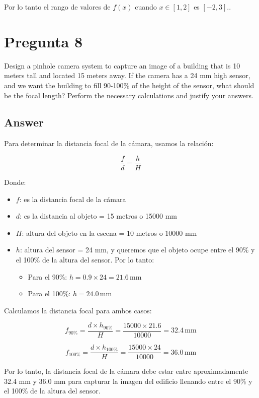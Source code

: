 \documentclass{article}
\begin{document}
Por lo tanto el rango de valores de $f(x)$ cuando $x \in [1, 2]$ es $[-2, 3]$..

\section{Pregunta 8}

Design a pinhole camera system to capture an image of a building that is 10 meters tall and located 15 meters away. If the camera has a 24 mm high sensor, and we want the building to fill 90-100\% of the height of the sensor, what should be the focal length? Perform the necessary calculations and justify your answers.

\subsection{Answer}

Para determinar la distancia focal de la cámara, usamos la relación:

\[
\frac{f}{d} = \frac{h}{H}
\]

Donde:

\begin{itemize}
    \item $f$: es la distancia focal de la cámara
    \item $d$: es la distancia al objeto = 15 metros o 15000 mm
    \item $H$: altura del objeto en la escena = 10 metros o 10000 mm
    \item $h$: altura del sensor = 24 mm, y queremos que el objeto ocupe entre el 90\% y el 100\% de la altura del sensor. Por lo tanto:

    \begin{itemize}
        \item Para el 90\%: $h = 0.9 \times 24 = 21.6 \, \text{mm}$
        \item Para el 100\%: $h = 24.0 \, \text{mm}$
    \end{itemize}
\end{itemize}

Calculamos la distancia focal para ambos casos:

\[
f_{90\%} = \frac{d \times h_{90\%}}{H} = \frac{15000 \times 21.6}{10000} = 32.4 \, \text{mm}
\]

\[
f_{100\%} = \frac{d \times h_{100\%}}{H} = \frac{15000 \times 24}{10000} = 36.0 \, \text{mm}
\]

Por lo tanto, la distancia focal de la cámara debe estar entre aproximadamente 32.4 mm y 36.0 mm para capturar la imagen del edificio llenando entre el 90\% y el 100\% de la altura del sensor.
\end{document}
